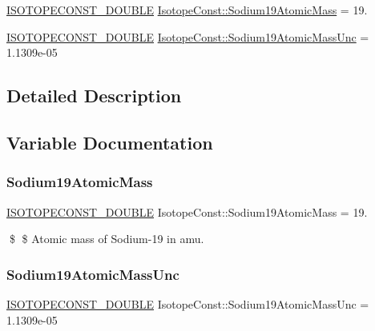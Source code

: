 \begin{DoxyCompactItemize}
\item 
\mbox{\hyperlink{group___isotope_const-_macros_ga8f45a7272ce02c0b4c65c44636ed719a}{I\+S\+O\+T\+O\+P\+E\+C\+O\+N\+S\+T\+\_\+\+D\+O\+U\+B\+LE}} \mbox{\hyperlink{group___isotope_const-_sodium-_na19_gaed5315ec304928107c5831c6e616c1ef}{Isotope\+Const\+::\+Sodium19\+Atomic\+Mass}} = 19.
\item 
\mbox{\hyperlink{group___isotope_const-_macros_ga8f45a7272ce02c0b4c65c44636ed719a}{I\+S\+O\+T\+O\+P\+E\+C\+O\+N\+S\+T\+\_\+\+D\+O\+U\+B\+LE}} \mbox{\hyperlink{group___isotope_const-_sodium-_na19_ga7bbaea0e712ef9ca66edfc26e58da4e8}{Isotope\+Const\+::\+Sodium19\+Atomic\+Mass\+Unc}} = 1.\+1309e-\/05
\end{DoxyCompactItemize}


\subsection{Detailed Description}


\subsection{Variable Documentation}
\mbox{\label{group___isotope_const-_sodium-_na19_gaed5315ec304928107c5831c6e616c1ef}} 
\subsubsection{\texorpdfstring{Sodium19\+Atomic\+Mass}{Sodium19AtomicMass}}
{\footnotesize\ttfamily \mbox{\hyperlink{group___isotope_const-_macros_ga8f45a7272ce02c0b4c65c44636ed719a}{I\+S\+O\+T\+O\+P\+E\+C\+O\+N\+S\+T\+\_\+\+D\+O\+U\+B\+LE}} Isotope\+Const\+::\+Sodium19\+Atomic\+Mass = 19.}

\$ \$ Atomic mass of Sodium-\/19 in amu. \mbox{\label{group___isotope_const-_sodium-_na19_ga7bbaea0e712ef9ca66edfc26e58da4e8}} 
\subsubsection{\texorpdfstring{Sodium19\+Atomic\+Mass\+Unc}{Sodium19AtomicMassUnc}}
{\footnotesize\ttfamily \mbox{\hyperlink{group___isotope_const-_macros_ga8f45a7272ce02c0b4c65c44636ed719a}{I\+S\+O\+T\+O\+P\+E\+C\+O\+N\+S\+T\+\_\+\+D\+O\+U\+B\+LE}} Isotope\+Const\+::\+Sodium19\+Atomic\+Mass\+Unc = 1.\+1309e-\/05}

